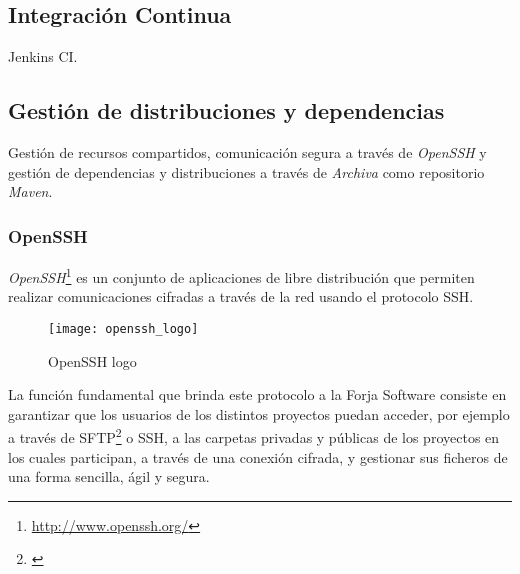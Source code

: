 

\subsection{Integración Continua}
\label{sub:ci-jenkins}

\par Jenkins CI.



\subsection{Gestión de distribuciones y dependencias}
\label{sub:distribuciones-dependencias}

\par Gestión de recursos compartidos, comunicación segura a través de \emph{OpenSSH} y gestión de dependencias y distribuciones a través de \emph{Archiva} como repositorio \emph{Maven}.

\subsubsection{OpenSSH}
\label{ssub:openssh}

\par \emph{OpenSSH}\footnote{\url{http://www.openssh.org/}} es un conjunto de aplicaciones de libre distribución que permiten realizar comunicaciones cifradas a través de la red usando el protocolo SSH.

\begin{figure}[H]
    \centering
    \texttt{[image: openssh\_logo]}
    \caption{OpenSSH logo}
    \label{fig:openssh_logo}
\end{figure}

\par La función fundamental que brinda este protocolo a la Forja Software consiste en garantizar que los usuarios de los distintos proyectos puedan acceder, por ejemplo a través de SFTP\footnote{\url{}} o SSH, a las carpetas privadas y públicas de los proyectos en los cuales participan, a través de una conexión cifrada, y gestionar sus ficheros de una forma sencilla, ágil y segura.

